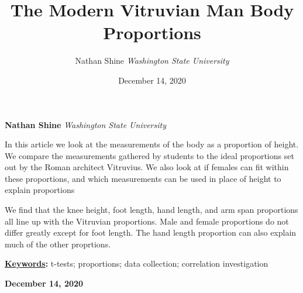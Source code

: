 \documentclass[]{article}
\title{\textbf{\textcolor{WSU.crimson}{The Modern Vitruvian
Man}} \newline \textbf{\textcolor{WSU.gray}{Body Proportions}}  }
\author{\Large Nathan
Shine\vspace{0.05in} \newline\normalsize\emph{Washington State
University}  }
\date{December 14, 2020}
\newcommand*{\authorfont}{\fontfamily{phv}\selectfont}
\renewenvironment{abstract}
 {{%
    \setlength{\leftmargin}{0mm}
    \setlength{\rightmargin}{\leftmargin}%
  }%
  \relax}
 {\endlist}
\begin{document}
	
%    


{%
\setlength{\parindent}{0pt}
\thispagestyle{plain}
{\fontsize{18}{20}\selectfont\raggedright 
\maketitle  %

}

{
   \vskip 13.5pt\relax \normalsize\fontsize{11}{12} 
   
\textbf{\authorfont Nathan Shine} \hskip 15pt \emph{\small Washington
State University}   

}

}








\begin{abstract}

    \hbox{\vrule height .2pt width 39.14pc}

    \vskip 8.5pt %

\noindent In this article we look at the measurements of the body as a
proportion of height. We compare the measurements gathered by students
to the ideal proportions set out by the Roman architect Vitruvius. We
also look at if females can fit within these proportions, and which
measurements can be used in place of height to explain
proportions\vspace{0.25in}

\noindent We find that the knee height, foot length, hand length, and
arm span proportions all line up with the Vitruvian proportions. Male
and female proportions do not differ greatly except for foot length. The
hand length proportion can also explain much of the other
proprtions.\vspace{0.25in}


\vskip 8.5pt \noindent \textbf{\underline{Keywords}:} t-tests;
proportions; data collection; correlation investigation \par

    




    
    \hbox{\vrule height .2pt width 39.14pc}
    \vskip 5pt 
    \hfill \textbf{\textcolor{WSU.gray}{ December 14, 2020 } }
    \vskip 5pt 
    
\end{abstract}
\end{document}
